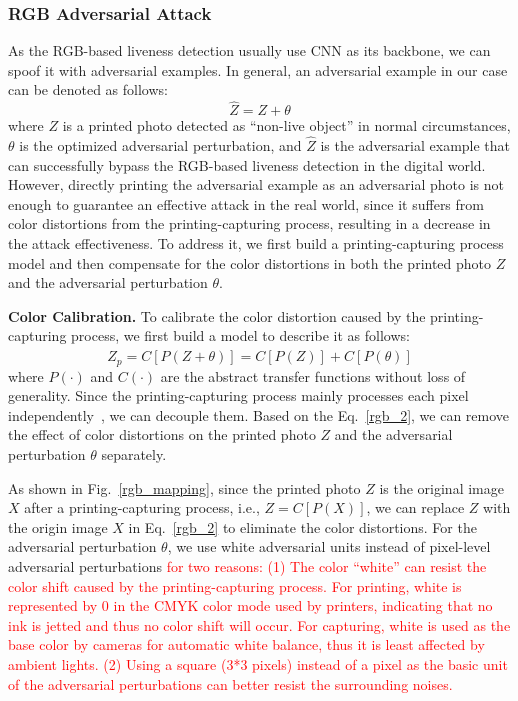\subsubsection{RGB Adversarial Attack}
As the RGB-based liveness detection usually use CNN as its backbone, we can spoof it with adversarial examples. In general, an adversarial example in our case can be denoted as follows: 
\begin{equation}
	\widehat{Z} = Z+\theta \label{rgb_1}
\end{equation}
where $Z$ is a printed photo detected as ``non-live object''  in normal circumstances,  $\theta$ is the optimized adversarial perturbation, and  $\widehat{Z}$ is the adversarial example that can successfully bypass the RGB-based liveness detection in the digital world. However, directly printing the adversarial example as
 an adversarial photo is not enough to guarantee an effective
 attack in the real world, since it suffers from color distortions
 from the printing-capturing process, resulting in a decrease
in the attack effectiveness.  To address it, we first build a printing-capturing
process model and then compensate for the color distortions
in both the printed photo $Z$ and the adversarial perturbation $\theta$.

\textbf{Color Calibration.}
To calibrate the color distortion caused by the printing-capturing process, we first build a model to describe it as follows:
\begin{equation}
	\widehat{Z}_p=C[P(Z+\theta)] =C[P(Z)]+C[P(\theta)]\label{rgb_2}
\end{equation}
where $P(\cdot)$ and $C(\cdot)$ are the abstract transfer functions without loss of generality. Since the printing-capturing process mainly processes each pixel independently~\cite{yin2013image}, we can decouple them. Based on the Eq.~\ref{rgb_2}, we can remove the effect of color distortions on the printed photo $Z$ and the adversarial perturbation $\theta$ separately.

As shown in Fig.~\ref{rgb_mapping}, since the printed photo $Z$ is the original image $X$ after a printing-capturing process, i.e., $Z=C[P(X)]$, we can replace $Z$ with the origin image $X$ in Eq.~\ref{rgb_2} to eliminate the color distortions. For the adversarial perturbation $\theta$, we use white adversarial units instead of pixel-level adversarial perturbations \textcolor{red}{for two reasons: (1) The color “white” can resist the color shift caused by the printing-capturing process. For printing, white is represented by 0 in the CMYK color mode used by printers, indicating that no ink is jetted and thus no color shift will occur. For capturing, white is used as the base color by cameras for automatic white balance, thus it is least affected by ambient lights. (2) Using a square (3*3 pixels) instead of a pixel as the basic unit of the adversarial perturbations can better resist the surrounding noises.}

